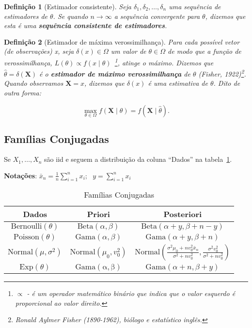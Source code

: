 \documentclass{article}
\newtheorem{definition}{Definição}
\begin{document}
\begin{definition}[Estimador consistente]
Seja $\delta_1, \delta_2, \ldots, \delta_n$ uma sequência de estimadores de $\theta$. Se quando $n \rightarrow \infty$ a sequência convergente para $\theta$, dizemos que esta é uma \textbf{sequência consistente de estimadores}.
\end{definition}

\begin{definition}[Estimador de máxima verossimilhança]
Para cada possível vetor (de observações) x, seja $\delta(x) \in \Omega$ um valor de $\theta \in \Omega$ de modo que a função de verossimilhança, $L(\theta) \propto f(x \mid \theta)$~\footnote{$\propto$ - é um operador matemático binário que indica que o valor esquerdo é proporcional ao valor direito.}, atinge o máximo.
Dizemos que $\hat\theta = \delta(\textbf{X})$ é o \textbf{estimador de máximo verossimilhança} de $\theta$ (Fisher, 1922)\footnote{Ronald Aylmer Fisher (1890-1962), biólogo e estatístico inglês.}. Quando observamos $\textbf{X} = x$, dizemos que $\delta(x)$ é uma estimativa de $\theta$. Dito de outra forma:

\begin{equation}
    \max_{\theta \in \Omega} f(\textbf{X} \mid \theta) = f(\textbf{X} \mid \hat\theta).
\end{equation}
\end{definition}

\subsection*{Famílias Conjugadas}

Se $X_1,\ldots,X_n$ são iid e seguem a distribuição da coluna ``Dados'' na tabela~\ref{tab:1}.

\textbf{Notações}: $\bar {x}_n= \frac{1}{n}\sum_{i=1}^n x_i;~~~
y=\sum_{i=1}^nx_i$
\begin{table}[!htb]
    \centering
    \begin{tabular}{|c|c|c|}
        \hline \textbf{Dados} & \textbf{Priori} & \textbf{Posteriori}\\ \hline
         $\mathrm{Bernoulli}(\theta)$&$\mathrm{Beta}(\alpha,\beta)$ & $\mathrm{Beta}(\alpha+y,\beta+n-y)$ \\ \hline
         $\mathrm{Poisson}(\theta)$&$\mathrm{Gama}(\alpha,\beta)$&$\mathrm{Gama}(\alpha+y,\beta+n)$\\ \hline 
         $\mathrm{Normal}(\mu,\sigma^2)$ & $\mathrm{Normal}(\mu_0,v_0^2)$& $\mathrm{Normal}\left(\frac{\sigma^2\mu_0+nv_0^2\bar{x}_n}{\sigma^2+nv_0^2},\frac{\sigma^2v_0^2}{\sigma^2+nv_0^2}\right)$ \\ \hline
         $\mathrm{Exp}(\theta)$ &$\mathrm{Gama(\alpha,\beta)}$ & $\mathrm{Gama}(\alpha+n,\beta+y)$ \\ \hline

    \end{tabular}
    \caption{Famílias Conjugadas}\label{tab:1}
\end{table}
\end{document}
